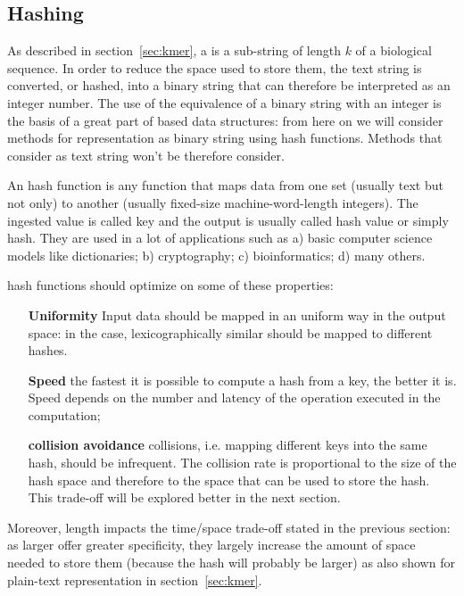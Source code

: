 \subsection{Hashing \kmers}
As described in section~\ref{sec:kmer}, a \kmer is a sub-string of length $k$ of a biological sequence. In order to reduce the space used to store them, the text string is converted, or hashed, into a binary string that can therefore be interpreted as an integer number. The use of the equivalence of a binary string with an integer is the basis of a great part of \kmer based data structures: from here on we will consider methods for \kmers representation as binary string using hash functions. Methods that consider \kmer as text string won't be therefore consider.
\begin{description}
	\item An hash function is any function that maps data from one set (usually text but not only) to another (usually fixed-size machine-word-length integers). The ingested value is called key and the output is usually called hash value or simply hash. They are used in a lot of applications such as a) basic computer science models like dictionaries; b) cryptography; c) bioinformatics; d) many others.
	\item hash functions should optimize on some of these properties:
	\begin{itemize}
		\item[\textbf{Uniformity}] Input data should be mapped in an uniform way in the output space: in the \kmer case, lexicographically similar \kmers should be mapped to different hashes.
		\item[\textbf{Speed}] the fastest it is possible to compute a hash from a key, the better it is. Speed depends on the number and latency of the operation executed in the computation;
		\item[\textbf{collision avoidance}] collisions, i.e. mapping different keys into the same hash, should be infrequent. The collision rate is proportional to the size of the hash space and therefore to the space that can be used to store the hash. This trade-off will be explored better in the next section.
	\end{itemize}
\end{description}
Moreover, \kmer length impacts the time/space trade-off stated in the previous section: as larger \kmer offer greater specificity, they largely increase the amount of space needed to store them (because the hash will probably be larger) as also shown for plain-text representation in section~\ref{sec:kmer}.

